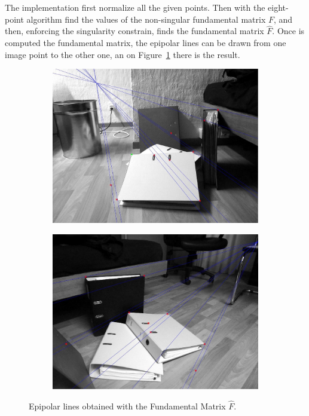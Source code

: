 \documentclass{ethz_report}
\begin{document}


The implementation first normalize all the given points. Then with the eight-point algorithm find
the values of the non-singular fundamental matrix $F$, and then, enforcing the singularity
constrain, finds the fundamental matrix $\hat F$. Once is computed the fundamental matrix, the
epipolar lines can be drawn from one image point to the other one, an on Figure~\ref{fig:fun_mat}
there is the result.

\begin{figure}[H]
\centering
\begin{subfigure}[b]{.5\textwidth}
  \centering
  \includegraphics[width=1\linewidth]{images/fmatrix_1}
\end{subfigure}%
\begin{subfigure}[b]{.5\textwidth}
  \centering
  \includegraphics[width=1\linewidth]{images/fmatrix_2}
\end{subfigure}
\caption{Epipolar lines obtained with the Fundamental Matrix $\hat F$.}
\label{fig:fun_mat}
\end{figure}
\end{document}
